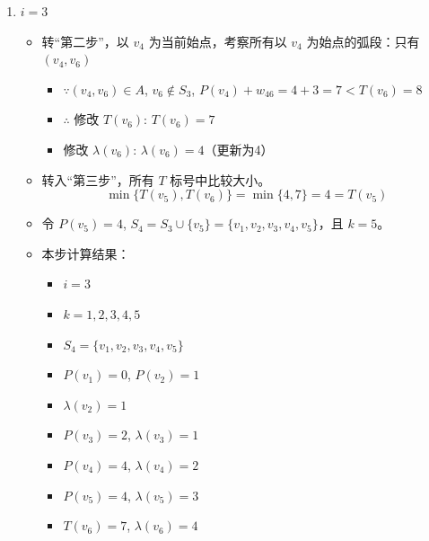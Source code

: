 \begin{enumerate}[label=(\arabic*)]
    \item \( i = 3 \)
    \begin{itemize}
        \item 转“第二步”，以 \( v_4 \) 为当前始点，考察所有以 \( v_4 \) 为始点的弧段：只有 \( (v_4, v_6) \)
        \begin{itemize}
            \item \(\because (v_4, v_6) \in A\), \( v_6 \notin S_3 \), \( P(v_4) + w_{46} = 4 + 3 = 7 < T(v_6) = 8 \)
            \item \(\therefore\) 修改 \( T(v_6) \): \( T(v_6) = 7 \)
            \item 修改 \( \lambda(v_6) \): \( \lambda(v_6) = 4 \)（更新为4）
        \end{itemize}
        \item 转入“第三步”，所有 \( T \) 标号中比较大小。
        \[
        \min\{T(v_5), T(v_6)\} = \min\{4, 7\} = 4 = T(v_5)
        \]
        \item 令 \( P(v_5) = 4 \), \( S_4 = S_3 \cup \{v_5\} = \{v_1, v_2, v_3, v_4, v_5\} \)，且 \( k = 5 \)。
        \item 本步计算结果：
        \begin{itemize}
            \item \( i = 3 \)
            \item \( k = 1, 2, 3, 4, 5 \)
            \item \( S_4 = \{v_1, v_2, v_3, v_4, v_5\} \)
            \item \( P(v_1) = 0 \), \( P(v_2) = 1 \)
            \item \( \lambda(v_2) = 1 \)
            \item \( P(v_3) = 2 \), \( \lambda(v_3) = 1 \)
            \item \( P(v_4) = 4 \), \( \lambda(v_4) = 2 \)
            \item \( P(v_5) = 4 \), \( \lambda(v_5) = 3 \)
            \item \( T(v_6) = 7 \), \( \lambda(v_6) = 4 \)
        \end{itemize}
    \end{itemize}


\end{enumerate}
